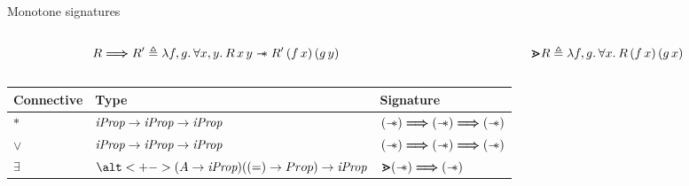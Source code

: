 \documentclass[aspectratio=169]{beamer}
\begin{document}
\begin{frame}{Monotone signatures}
    \begin{columns}
        \begin{column}{.5\textwidth}
            \begin{definition}
                \vspace*{-.5cm}
                \begin{align*}
                    \rel \respect \rel' \eqdef \Lam \func, \funcB. \All \var,\varB. \rel\, \var\, \varB \wand \rel'\, (\func\, \var)\, (\funcB\, \varB)
                \end{align*}
            \end{definition}
        \end{column}
        \begin{column}{.5\textwidth}
            \begin{definition}
                \vspace*{-.5cm}
                \begin{align*}
                    \point \rel \eqdef \Lam \func, \funcB. \All \var. \rel\, (\func\, \var)\, (\funcB\, \var)
                \end{align*}
            \end{definition}
        \end{column}
    \end{columns}
    \begin{center}
        \parencite{sozeauNewLookGeneralized2009}
    \end{center}
    \begin{table}
        \begin{tabular}{lll}
            Connective & Type                                                        & Signature                                      \\
            \hline
            $*$        & $\textit{iProp} \to \textit{iProp} \to \textit{iProp}$                                 & $(\mathrel{-\!\!\ast}) \mathrel{\bm{\Longrightarrow}} (\mathrel{-\!\!\ast}) \mathrel{\bm{\Longrightarrow}} (\mathrel{-\!\!\ast})$ \\\pause
            $\lor$     & $\textit{iProp} \to \textit{iProp} \to \textit{iProp}$                                 & $(\mathrel{-\!\!\ast}) \mathrel{\bm{\Longrightarrow}} (\mathrel{-\!\!\ast}) \mathrel{\bm{\Longrightarrow}} (\mathrel{-\!\!\ast})$ \\\pause
            $\exists$  & $\alt<+->{(\sigax \to \Prop)}{(\eqrel \to Prop)} \to \Prop$ & $\bm{\gtrdot}(\mathrel{-\!\!\ast}) \mathrel{\bm{\Longrightarrow}} (\mathrel{-\!\!\ast})$
        \end{tabular}
    \end{table}


\end{frame}
\end{document}
